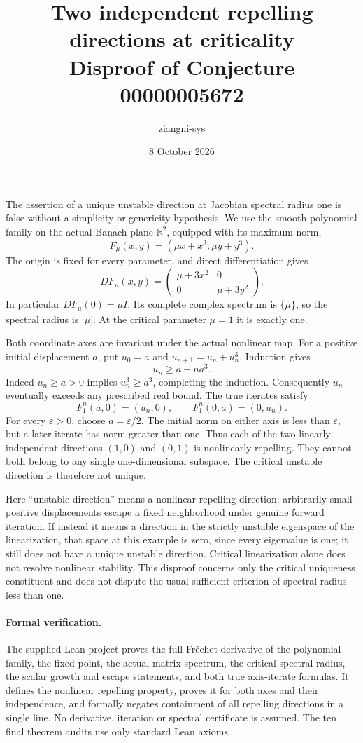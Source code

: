 \documentclass[11pt]{article}
\title{Two independent repelling directions at criticality\\Disproof of Conjecture 00000005672}
\author{ziangni-sys}\date{8 October 2026}
\begin{document}
\maketitle
The assertion of a unique unstable direction at Jacobian spectral radius one is false without a simplicity or genericity hypothesis. We use the smooth polynomial family on the actual Banach plane $\mathbb R^2$, equipped with its maximum norm,
\[
 F_\mu(x,y)=(\mu x+x^3,\mu y+y^3).
\]
The origin is fixed for every parameter, and direct differentiation gives
\[
 DF_\mu(x,y)=\begin{pmatrix}\mu+3x^2&0\\0&\mu+3y^2\end{pmatrix}.
\]
In particular $DF_\mu(0)=\mu I$. Its complete complex spectrum is $\{\mu\}$, so the spectral radius is $|\mu|$. At the critical parameter $\mu=1$ it is exactly one.

Both coordinate axes are invariant under the actual nonlinear map. For a positive initial displacement $a$, put $u_0=a$ and $u_{n+1}=u_n+u_n^3$. Induction gives
\[
 u_n\ge a+n a^3.
\]
Indeed $u_n\ge a>0$ implies $u_n^3\ge a^3$, completing the induction. Consequently $u_n$ eventually exceeds any prescribed real bound. The true iterates satisfy
\[
 F_1^n(a,0)=(u_n,0),\qquad F_1^n(0,a)=(0,u_n).
\]
For every $\varepsilon>0$, choose $a=\varepsilon/2$. The initial norm on either axis is less than $\varepsilon$, but a later iterate has norm greater than one. Thus each of the two linearly independent directions $(1,0)$ and $(0,1)$ is nonlinearly repelling. They cannot both belong to any single one-dimensional subspace. The critical unstable direction is therefore not unique.

Here ``unstable direction'' means a nonlinear repelling direction: arbitrarily small positive displacements escape a fixed neighborhood under genuine forward iteration. If instead it means a direction in the strictly unstable eigenspace of the linearization, that space at this example is zero, since every eigenvalue is one; it still does not have a unique unstable direction. Critical linearization alone does not resolve nonlinear stability. This disproof concerns only the critical uniqueness constituent and does not dispute the usual sufficient criterion of spectral radius less than one.

\paragraph{Formal verification.} The supplied Lean project proves the full Fr\'echet derivative of the polynomial family, the fixed point, the actual matrix spectrum, the critical spectral radius, the scalar growth and escape statements, and both true axis-iterate formulas. It defines the nonlinear repelling property, proves it for both axes and their independence, and formally negates containment of all repelling directions in a single line. No derivative, iteration or spectral certificate is assumed. The ten final theorem audits use only standard Lean axioms.
\end{document}
